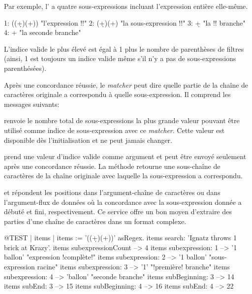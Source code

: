 \documentclass[a4paper,10pt,twoside]{book}
\begin{document}
Par exemple, l'\expreg \ct{((\d+)\s*(\w+))} a quatre sous-expressions
incluant l'expression entière elle-même.
\begin{code}{}
1:    ((\d+)\s*(\w+))    "l'expression !!"
2:    (\d+)\s*(\w+)       "la sous-expression !!"
3:    \d+                      "la !! branche"
4:    \w+                     "la seconde branche"
\end{code}

L'indice valide le plus élevé est égal à 1 plus le nombre de
parenthèses de filtres (ainsi, 1 est toujours un indice valide même
s'il n'y a pas de sous-expressions parenthésées).

Après une concordance réussie, le \emph{matcher} peut dire quelle
partie de la chaîne de caractères originale a correspondu à quelle
sous-expression. Il comprend les messages suivants:

 renvoie le nombre total de
sous-expressions \ie la plus grande valeur pouvant être utilisé comme
indice de sous-expression avec ce \emph{matcher}. Cette valeur est
disponible dès l'initialisation et ne peut jamais changer.

 prend une valeur d'indice valide
comme argument et peut être envoyé seulement après une concordance
réussie. La méthode retourne une sous-chaîne de caractères de la
chaîne originale avec laquelle la sous-expression a correspondu.

 et 
répondent les positions dans l'argument-chaîne de caractères ou dans
l'argument-flux de données où la concordance avec la sous-expression
donnée a débuté et fini, respectivement.
Ce service offre un bon moyen d'extraire des parties d'une chaîne de
caractères dans un format complexe.

\begin{code}{@TEST | items |}
items := '((\d+)\s*(\w+))' asRegex.
items search: 'Ignatz throws 1 brick at Krazy'.
items subexpressionCount --> 4
items subexpression: 1      --> '1 ballon'    "expression !complète!"
items subexpression: 2      --> '1 ballon'    "sous-expression racine"
items subexpression: 3      --> '1'             "!première! branche"
items subexpression: 4      --> 'ballon'       "seconde branche"
items subBeginning: 3       --> 14
items subEnd: 3                 --> 15
items subBeginning: 4       --> 16
items subEnd: 4                 --> 22
\end{code}
\end{document}

